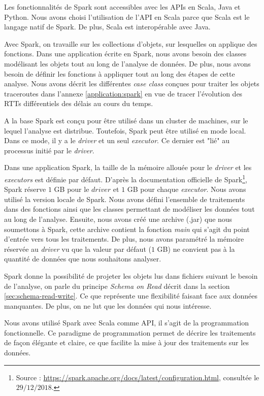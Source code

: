 Les fonctionnalités de Spark sont accessibles avec les  APIs en Scala, Java et Python. Nous avons choisi l'utilisation de l'API en Scala parce que Scala est le langage natif de Spark. De plus, Scala est interopérable avec Java.  

Avec Spark, on travaille sur les collections d'objets, sur lesquelles on applique des fonctions. Dans une application écrite en Spark, nous avons besoin des classes modélisant les objets tout au long de l'analyse de données. De plus, nous avons besoin de définir les fonctions à appliquer tout au long des étapes de cette analyse. Nous avons décrit les différentes \textit{case class} conçues pour traiter les objets traceroutes dans l'annexe \ref{application:spark} en vue de tracer l'évolution des RTTs différentiels des délais au cours du temps. 

A la base Spark est conçu pour être utilisé dans un cluster de machines, sur le lequel l'analyse est distribue. Toutefois, Spark peut être utilisé en mode local. Dans ce mode, il y a le \textit{driver} et un seul \textit{executor}. Ce dernier est "lié" au processus initié par le \textit{driver}. 

Dans une application Spark, la taille de la mémoire allouée pour le \textit{driver} et les \textit{executors} est  définie par défaut. D'après la documentation officielle de Spark\footnote{Source : \url{https://spark.apache.org/docs/latest/configuration.html}, consultée le $29/12/2018$.}, Spark réserve $ 1 $ GB pour le $ driver $ et $ 1 $ GB pour chaque \textit{executor}. 
Nous avons utilisé la version locale de Spark. Nous avons défini l'ensemble de traitements dans des fonctions ainsi que les classes permettant de modéliser les données tout au long de l'analyse. Ensuite, nous avons créé une archive (.jar) que nous soumettons à Spark, cette archive contient la fonction \textit{main} qui s'agit du point d'entrée vers tous les traitements. De plus, nous avons paramétré la mémoire  réservée au \textit{driver} vu que la valeur par défaut ($1$ GB) ne convient pas à la quantité de données que nous souhaitons analyser.


Spark donne la possibilité  de projeter les objets lus  dans  fichiers suivant le besoin de l'analyse, on parle du principe \textit{ Schema on Read} décrit dans la section \ref{sec:schema-read-write}. Ce que représente une flexibilité faisant face aux données manquantes.  De plus, on ne lut que les données qui nous intéresse. 
 

Nous avons utilisé Spark avec Scala comme API, il s'agit de la programmation fonctionnelle. Ce paradigme de programmation permet de décrire les traitements de façon élégante et claire, ce que facilite la mise à jour des traitements sur les données. 

